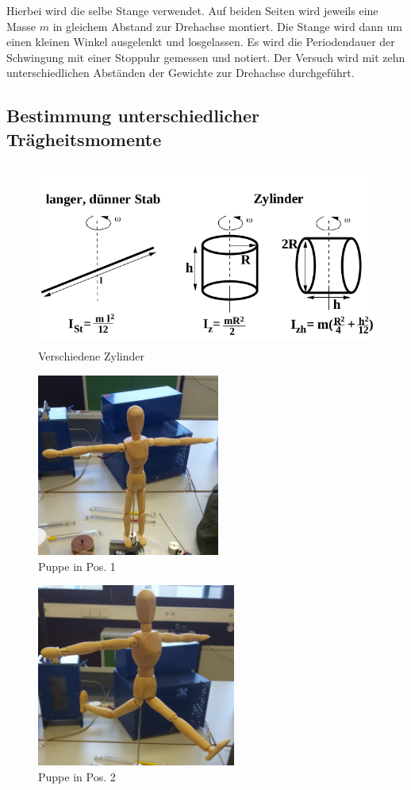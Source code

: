 Hierbei wird die selbe Stange verwendet. Auf beiden Seiten wird jeweils eine Masse $m$ in gleichem Abstand zur 
Drehachse montiert. Die Stange wird dann um einen kleinen Winkel ausgelenkt und losgelassen. Es wird die Periodendauer der Schwingung
mit einer Stoppuhr gemessen und notiert. Der Versuch wird mit zehn unterschiedlichen Abständen der Gewichte zur Drehachse durchgeführt.

\subsection{Bestimmung unterschiedlicher Trägheitsmomente}
\begin{figure}
    \centering
    \includegraphics[height=6cm]{data/Probekoerper}
    \caption{Verschiedene Zylinder}
    \label{fig:Probekoerper}
\end{figure}


\begin{figure}
    \centering
    \includegraphics[height=6cm]{data/puppe_2}
    \caption{Puppe in Pos. 1}
    \label{fig:puppe_2}
\end{figure}

\begin{figure}
    \centering
    \includegraphics[height=6cm]{data/puppe_1}
    \caption{Puppe in Pos. 2}
    \label{fig:puppe_1}
\end{figure}



